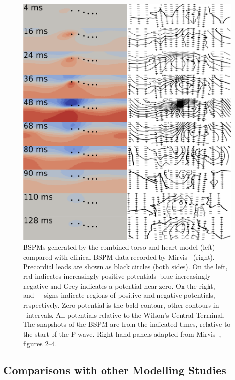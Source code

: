 \begin{figure}
\includegraphics{figures/bsp/mirvis_compare}
\caption[Comparative BSPM from the fully inhomogeneous model and Mirvis]{
\label{bsp:fig:mirvis_compare}
BSPMs generated by the combined torso and heart model (left) compared with
clinical BSPM data recorded by Mirvis~\cite{Mirvis1980} (right).
Precordial leads are shown as black circles (both sides).
On the left, red indicates increasingly positive potentials, blue increasingly
negative and Grey indicates a potential near zero.
On the right, $+$ and $-$ signs indicate regions of positive and negative
potentials, respectively.
Zero potential is the bold contour, other contours in \ intervals.
All potentials relative to the Wilson's Central Terminal.
The snapshots of the BSPM are from the indicated times, relative to the start of
the P-wave.
Right hand panels adapted from Mirvis~\cite{Mirvis1980}, figures 2--4.
}
\end{figure}

\subsection{Comparisons with other Modelling Studies}


